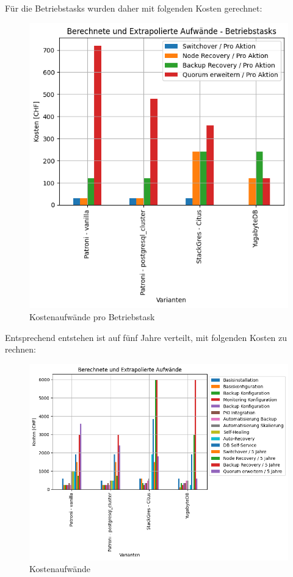 \begin{flushleft}
    Für die Betriebstasks wurden daher mit folgenden Kosten gerechnet:
    \begin{figure}[H]
        \centering
        \includegraphics[width=1\linewidth]{source/pandas_data_chart_plotter/cost_investment_action}
        \caption{Kostenaufwände pro Betriebstask}
        \label{fig:cost_investment_action}
    \end{figure}
\end{flushleft}
\begin{flushleft}
    Entsprechend entstehen ist auf fünf Jahre verteilt, mit folgenden Kosten zu rechnen:
    \begin{figure}[H]
        \centering
        \includegraphics[width=1\linewidth]{source/pandas_data_chart_plotter/cost_investment}
        \caption{Kostenaufwände}
        \label{fig:cost_investment}
    \end{figure}
\end{flushleft}
